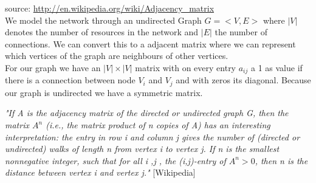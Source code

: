 source: \url{http://en.wikipedia.org/wiki/Adjacency_matrix} \\
We model the network through an undirected Graph $G = < V, E> $ where $|V|$ denotes the number of resources in the network and $|E|$ the number of connections. We can convert this to a adjacent matrix where we can represent which vertices of the graph are neighbours of other vertices. \\
For our graph we have an $|V| \times |V|$ matrix with on every entry $a_{ij}$ a 1 as value if there is a connection between node $V_{i}$ and $V_{j}$ and with zeros its diagonal. Because our graph is undirected we have a symmetric matrix. 

\textit{"If \textit{A} is the adjacency matrix of the directed or undirected graph \textit{G}, then the matrix $A^{n}$ (i.e., the matrix product of n copies of \textit{A}) has an interesting interpretation: the entry in row i and column j gives the number of (directed or undirected) walks of length n from vertex i to vertex j. If n is the smallest nonnegative integer, such that for all i ,j , the (i,j)-entry of $A^{n} > 0$, then n is the distance between vertex i and vertex j."} [Wikipedia]

